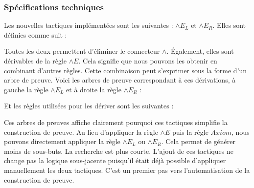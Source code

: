 \documentclass[titlepage,draft]{article}
\begin{document}
\subsubsection{Spécifications techniques} \label{SpecsTactiques}
Les nouvelles tactiques implémentées sont les suivantes : $\land E_L$ et $\land E_R$. Elles sont définies comme suit :
Toutes les deux permettent d'éliminer le connecteur $\land$. Également, elles sont dérivables de la règle $\land E$. Cela signifie que nous pouvons les obtenir en combinant d'autres règles. Cette combinaison peut s'exprimer sous la forme d'un arbre de preuve. Voici les arbres de preuve correspondant à ces dérivations, à gauche la règle $\land E_L$ et à droite la règle $\land E_R$ :
Et les règles utilisées pour les dériver sont les suivantes :
Ces arbres de preuves affiche clairement pourquoi ces tactiques simplifie la construction de preuve. Au lieu d'appliquer la règle $\land E$ puis la règle $Axiom$, nous pouvons directement appliquer la règle $\land E_L$ ou $\land E_R$. Cela permet de générer moins de sous-buts. La recherche est plus courte. L'ajout de ces tactiques ne change pas la logique sous-jacente puisqu'il était déjà possible d'appliquer manuellement les deux tactiques. C'est un premier pas vers l'automatisation de la construction de preuve.
\end{document}
